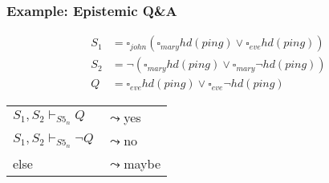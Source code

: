 \begin{frame}[fragile]
    \def\mybox#1{\square_{#1}}
    \def\mydia#1{\lozenge_{#1}}
    \def\sfiven{{S5_n}}
    \frametitle{Example: Epistemic Q\&A}
    \centering

    {\color{logicfont}
        \begin{align*}
            S_1 &= \mybox{john}(\mybox{mary} hd(ping)\vee \mybox{eve}hd(ping))\\
            S_2 &= \neg(\mybox{mary}hd(ping) \vee \mybox{mary}\neg hd(ping))\\
            Q &= \mybox{eve}hd(ping) \vee \mybox{eve}\neg hd(ping)
        \end{align*}
    }

    \begin{table}
        \begin{tabular}{l l}
            $S_1, S_2 \vdash_\sfiven Q$\quad      &$\leadsto$\quad yes\\
            $S_1, S_2 \vdash_\sfiven \neg Q$\quad &$\leadsto$\quad no\\
            else &$\leadsto$\quad maybe
        \end{tabular}
    \end{table}
\end{frame}
